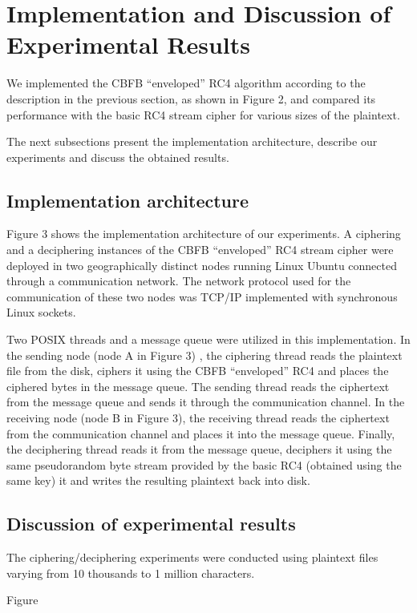\documentclass[conference]{IEEEtran}
\begin{document}
\section{Implementation and Discussion of Experimental Results}

We implemented the CBFB “enveloped” RC4 algorithm according to the description in the previous section, as shown in Figure 2, and compared its performance with the basic RC4 stream cipher for various sizes of the plaintext. 

The next subsections present the implementation architecture, describe our experiments and discuss the obtained results.

\subsection{Implementation architecture}

Figure 3 shows the implementation architecture of our experiments. A ciphering and a deciphering instances of the CBFB “enveloped” RC4 stream cipher were deployed in two geographically distinct nodes running Linux Ubuntu connected through a communication network. The network protocol used for the communication of these two nodes was TCP/IP implemented with synchronous Linux sockets.

Two POSIX threads and a message queue were utilized in this implementation. In the sending node (node A in Figure 3) , the ciphering thread reads the plaintext file from the disk, ciphers it using the CBFB “enveloped” RC4 and places the ciphered bytes in the message queue. The sending thread reads the ciphertext from the message queue and sends it through the communication channel. In the receiving node (node B in Figure 3), the receiving thread reads the ciphertext from the communication channel and places it into the message queue. Finally, the deciphering thread reads it from the message queue, deciphers it using the same pseudorandom byte stream provided by the basic RC4 (obtained using the same key) it and writes the resulting plaintext back into disk.

\subsection{Discussion of experimental results}

The ciphering/deciphering experiments were conducted using plaintext files varying from 10 thousands to 1 million characters. 

Figure
\end{document}
